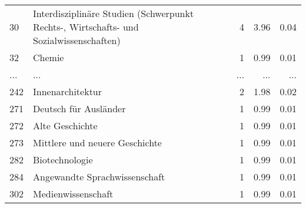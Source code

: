 \begin{longtable}{lXrrr}
        30 & \multicolumn{1}{X}{Interdisziplinäre Studien (Schwerpunkt Rechts-, Wirtschafts- und Sozialwissenschaften)} & %
          \num{4} &
          \num[round-mode=places,round-precision=2]{3.96} &
          \num[round-mode=places,round-precision=2]{0.04} \\
        32 & \multicolumn{1}{X}{Chemie} & %
          \num{1} &
          \num[round-mode=places,round-precision=2]{0.99} &
          \num[round-mode=places,round-precision=2]{0.01} \\
       ... & ... & ... & ... & ... \\
        242 & \multicolumn{1}{X}{Innenarchitektur} & %
          \num{2} &
          \num[round-mode=places,round-precision=2]{1.98} &
          \num[round-mode=places,round-precision=2]{0.02} \\

        271 & \multicolumn{1}{X}{Deutsch für Ausländer} & %
          \num{1} &
          \num[round-mode=places,round-precision=2]{0.99} &
          \num[round-mode=places,round-precision=2]{0.01} \\

        272 & \multicolumn{1}{X}{Alte Geschichte} & %
          \num{1} &
          \num[round-mode=places,round-precision=2]{0.99} &
          \num[round-mode=places,round-precision=2]{0.01} \\

        273 & \multicolumn{1}{X}{Mittlere und neuere Geschichte} & %
          \num{1} &
          \num[round-mode=places,round-precision=2]{0.99} &
          \num[round-mode=places,round-precision=2]{0.01} \\

        282 & \multicolumn{1}{X}{Biotechnologie} & %
          \num{1} &
          \num[round-mode=places,round-precision=2]{0.99} &
          \num[round-mode=places,round-precision=2]{0.01} \\

        284 & \multicolumn{1}{X}{Angewandte Sprachwissenschaft} & %
          \num{1} &
          \num[round-mode=places,round-precision=2]{0.99} &
          \num[round-mode=places,round-precision=2]{0.01} \\

        302 & \multicolumn{1}{X}{Medienwissenschaft} & %
          \num{1} &
          \num[round-mode=places,round-precision=2]{0.99} &
          \num[round-mode=places,round-precision=2]{0.01} \\


\end{longtable}
